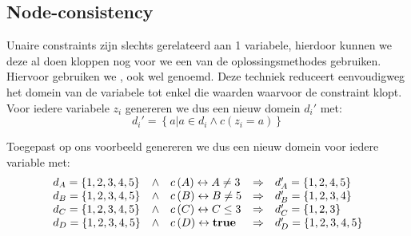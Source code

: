 \subsection{Node-consistency}
Unaire constraints zijn slechts gerelateerd aan 1 variabele, hierdoor kunnen we deze al doen kloppen nog voor we een van de oplossingsmethodes gebruiken. Hiervoor gebruiken we , ook wel  genoemd. Deze techniek reduceert eenvoudigweg het domein van de variabele tot enkel die waarden waarvoor de constraint klopt. Voor iedere variabele $z_i$ genereren we dus een nieuw domein $d_i'$ met:
\begin{equation}
d_i'=\left\{a|a\in d_i\wedge c\left(z_i=a\right)\right\}
\end{equation}
\begin{leftbar}
Toegepast op ons voorbeeld genereren we dus een nieuw domein voor iedere variable met:
\begin{equation}
\begin{array}{lclcl}
d_A=\left\{1,2,3,4,5\right\}&\wedge&c\left(A\right)\leftrightarrow A\neq 3&\Rightarrow&d_A'=\left\{1,2,4,5\right\}\\
d_B=\left\{1,2,3,4,5\right\}&\wedge&c\left(B\right)\leftrightarrow B\neq 5&\Rightarrow&d_B'=\left\{1,2,3,4\right\}\\
d_C=\left\{1,2,3,4,5\right\}&\wedge&c\left(C\right)\leftrightarrow C\leq 3&\Rightarrow&d_C'=\left\{1,2,3\right\}\\
d_D=\left\{1,2,3,4,5\right\}&\wedge&c\left(D\right)\leftrightarrow\mbox{\bf true}&\Rightarrow&d_D'=\left\{1,2,3,4,5\right\}
\end{array}
\end{equation}
\end{leftbar}

